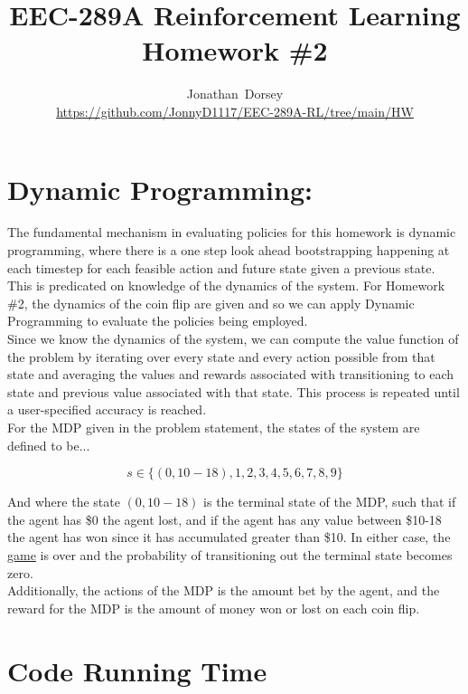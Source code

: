 \documentclass[12pt]{article}
\begin{document}
\title{ EEC-289A Reinforcement Learning \\ Homework \#2 }


\author{Jonathan~Dorsey \\\url{https://github.com/JonnyD1117/EEC-289A-RL/tree/main/HW}}
\maketitle

\section*{Dynamic Programming:}

The fundamental mechanism in evaluating policies for this homework is dynamic programming, where there is a one step look ahead bootstrapping happening at each timestep for each feasible action and future state given a previous state. This is predicated on knowledge of the dynamics of the system. For Homework \#2, the dynamics of the coin flip are given and so we can apply Dynamic Programming to evaluate the policies being employed. \\

Since we know the dynamics of the system, we can compute the value function of the problem by iterating over every state and every action possible from that state and averaging the values and rewards associated with transitioning to each state and previous value associated with that state. This process is repeated until a user-specified accuracy is reached. \\

For the MDP given in the problem statement, the states of the system are defined to be...

$$ s \in \{(0,10-18), 1, 2, 3, 4, 5 ,6, 7, 8, 9 \}$$

\noindent And where the state $(0,10-18)$ is the terminal state of the MDP, such that if the agent has \$0 the agent lost, and if the agent has any value between \$10-18 the agent has won since it has accumulated greater than \$10. In either case, the \underline{game} is over and the probability of transitioning out the terminal state becomes zero. \\

\noindent Additionally, the actions of the MDP is the amount bet by the agent, and the reward for the MDP is the amount of money won or lost on each coin flip.




\section*{Code Running Time}
\end{document}
